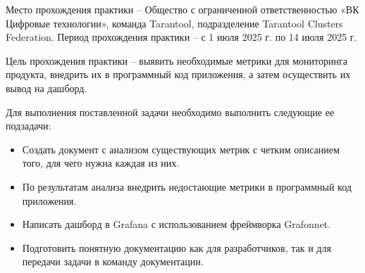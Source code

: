 \introduction

Место прохождения практики – Общество с ограниченной ответственностью «ВК Цифровые технологии», команда Tarantool,
подразделение Tarantool Clusters Federation. Период прохождения практики – с 1 июля 2025 г. по 14 июля 2025 г.

Цель прохождения практики -- выявить необходимые метрики для мониторинга продукта, внедрить их в программный код приложения, а затем
осуществить их вывод на дашборд.

Для выполнения поставленной задачи необходимо выполнить следующие ее подзадачи:

\begin{itemize}
  \item Создать документ с анализом существующих метрик с четким описанием того, для чего нужна каждая из них.
  \item По результатам анализа внедрить недостающие метрики в программный код приложения.
  \item Написать дашборд в Grafana с использованием фреймворка Grafonnet.
  \item Подготовить понятную документацию как для разработчиков, так и для передачи задачи в команду документации.
\end{itemize}
